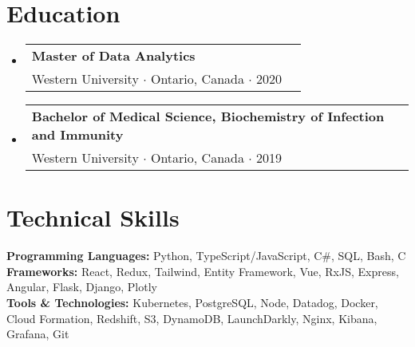 \documentclass[letterpaper,10pt]{article}
\makeatletter
\newcommand{\resumeEducationHeading}[4]{
  \vspace{-2pt}\item
    \begin{tabular*}{0.97\textwidth}[t]{l@{\extracolsep{\fill}}r}
      \textbf{#1}\\
      \quad \small#3 $\cdot$ \small #4 $\cdot$ #2\\
    \end{tabular*}\vspace{-5pt}
}
\newcommand{\resumeOrganizationHeading}[4]{
  \vspace{-2pt}\item
    \begin{tabular*}{0.97\textwidth}[t]{l@{\extracolsep{\fill}}r}
      \textbf{#1} & \textit{\small #2} \\
      \textit{\small#3}
    \end{tabular*}\vspace{-7pt}
}
\newcommand{\resumeSubHeadingListStart}{\begin{itemize}[leftmargin=0.15in, label={}]}
\newcommand{\resumeSubHeadingListEnd}{\end{itemize}}
\makeatother
\begin{document}

\vspace*{1pt}
\section{Education}
  \vspace{3pt}
  \resumeSubHeadingListStart
    
    \resumeEducationHeading
      {Master of Data Analytics}{2020}
      {Western University}{Ontario, Canada}

    \resumeEducationHeading
      {Bachelor of Medical Science, Biochemistry of Infection and Immunity}{2019}
      {Western University}{Ontario, Canada}

    \resumeSubHeadingListEnd


\vspace*{1pt}
\section{Technical Skills}
  \vspace{3pt}
  \resumeSubHeadingListStart
    \small{\item{
        \textbf{Programming Languages:}{ Python, TypeScript/JavaScript, C\#, SQL, Bash, C } \\ \vspace{3pt}
        \textbf{Frameworks:}{ React, Redux, Tailwind, Entity Framework, Vue, RxJS, Express, Angular, Flask, Django, Plotly } \\ \vspace{3pt}
        \textbf{Tools \& Technologies:}{ Kubernetes, PostgreSQL, Node, Datadog, Docker, Cloud Formation, Redshift, S3, DynamoDB, LaunchDarkly, Nginx, Kibana, Grafana, Git } \\
    }}
  \resumeSubHeadingListEnd



    
    

\end{document}
